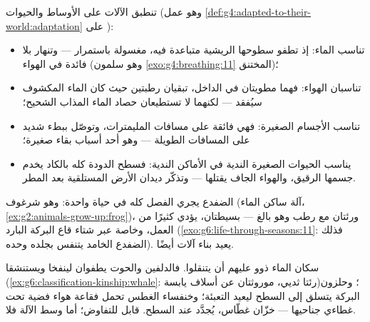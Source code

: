 \begin{proposition}\label{prop:g7:how-animals-breathe:fits}
تنطبق الآلات على الأوساط والحيوات
(وهو عمل \cref{def:g4:adapted-to-their-world:adaptation} على
):
\begin{itemize}
  \item {} تناسب الماء: إذ تطفو سطوحها الريشية متباعدة فيه،
        مغسولة باستمرار --- وتنهار بلا فائدة في الهواء (وهو
        سلمون \cref{exo:g4:breathing:11} المختنق)؛
  \item {} تناسبان الهواء: فهما مطويتان في الداخل، تبقيان
        رطبتين حيث كان الماء المكشوف سيُفقد --- لكنهما لا تستطيعان
        حصاد  الماء المذاب الشحيح؛
  \item {} تناسب الأجسام الصغيرة: فهي فائقة على
        مسافات المليمترات، وتوصّل ببطء شديد على المسافات الطويلة
        --- وهو أحد أسباب بقاء  صغيرة؛
  \item {} يناسب الحيوات الصغيرة الندية  في
        الأماكن الندية: فسطح الدودة كله بالكاد يخدم جسمها الرقيق،
        والهواء الجاف يقتلها --- وتذكّر ديدان الأرض المستلقية بعد
        المطر.
\end{itemize}
\end{proposition}
\admitted

\begin{example}\label{ex:g7:how-animals-breathe:frog}
الضفدع يجري الفصل كله في حياة واحدة:  وهو شرغوف (آلة ساكن
الماء، \cref{ex:g2:animals-grow-up:frog})، ورئتان مع  رطب وهو
بالغ ---  بسيطتان،  يؤدي كثيرًا من العمل، وخاصة عبر
شتاء قاع البركة البارد
(\cref{exo:g6:life-through-seasons:11}: فذلك الضفدع الخامد يتنفس
بجلده وحده).  يعيد بناء آلات  أيضًا.
\end{example}

\begin{example}\label{ex:g7:how-animals-breathe:airinwater}
سكان الماء ذوو  عليهم أن يتنقلوا. فالدلفين والحوت يطفوان
لينفخا ويستنشقا
(\cref{ex:g6:classification-kinship:whale}: رئتا ثديي، موروثتان عن
أسلاف يابسة)؛ وحلزون البركة يتسلق إلى السطح ليعيد التعبئة؛ وخنفساء
الغطس تحمل فقاعة هواء فضية تحت غطاءي جناحيها --- خزّان غطّاس،
يُجدَّد عند السطح.  قابل للتفاوض؛ أما وسط الآلة فلا.
\end{example}

